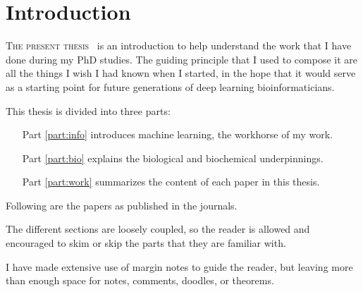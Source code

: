 \chapter{Introduction}

\lettrine[lines=3, lhang=0.25,  nindent=0em, findent=2pt]{\color{Maroon}T}{he present thesis\ }
is an introduction to help understand the work that I have done during my PhD studies.
The guiding principle that I used to compose it are all the things I wish I had known when I started, in the hope that it would serve as a starting point for future generations of deep learning bioinformaticians.

This thesis is divided into three parts:

\begin{itemize}
	\item[Part \ref{part:info}] introduces machine learning, the workhorse of my work.
	\item[Part \ref{part:bio}] explains the biological and biochemical underpinnings.
	\item[Part \ref{part:work}] summarizes the content of each paper in this thesis.
\end{itemize}

Following are the papers as published in the journals.

The different sections are loosely coupled, so the reader is allowed and encouraged to skim or skip the parts that they are familiar with.

I have made extensive use of margin notes to guide the reader, but leaving more than enough space for notes, comments, doodles, or theorems.

